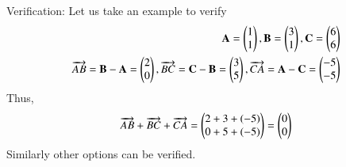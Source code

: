 \documentclass[journal,12pt,twocolumn]{IEEEtran}
\begin{document}
Verification: Let us take an example to verify 
\begin{align}
\mathbf{A} = \begin{pmatrix}1\\1\end{pmatrix}, 
\mathbf{B} = \begin{pmatrix}3\\1\end{pmatrix},
\mathbf{C} = \begin{pmatrix}6\\6\end{pmatrix} \\
\overrightarrow{AB} = \mathbf{B} - \mathbf{A} = \begin{pmatrix}2\\0\end{pmatrix}, 
\overrightarrow{BC} = \mathbf{C} - \mathbf{B} = \begin{pmatrix}3\\5\end{pmatrix},
\overrightarrow{CA} = \mathbf{A} - \mathbf{C} = \begin{pmatrix}-5\\-5\end{pmatrix} 
\end{align}
Thus,
\begin{align}
\overrightarrow{AB}+\overrightarrow{BC}+\overrightarrow{CA} = \begin{pmatrix}2+3+(-5) \\ 0+5+(-5)\end{pmatrix} = \begin{pmatrix}0 \\0\end{pmatrix}
\end{align}
Similarly other options can be verified.
\end{document}

